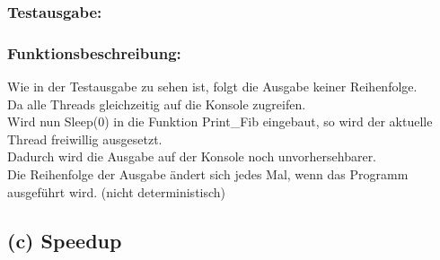\documentclass[a4paper,12pt]{article}
\begin{document}
\subsubsection{Testausgabe:}

\subsubsection{Funktionsbeschreibung:}
Wie in der Testausgabe zu sehen ist, folgt die Ausgabe keiner Reihenfolge.\\
Da alle Threads gleichzeitig auf die Konsole zugreifen.\\
Wird nun Sleep(0) in die Funktion Print\_Fib eingebaut, so wird der aktuelle Thread freiwillig ausgesetzt.\\
Dadurch wird die Ausgabe auf der Konsole noch unvorhersehbarer.\\
Die Reihenfolge der Ausgabe ändert sich jedes Mal, wenn das Programm ausgeführt wird. (nicht deterministisch)\\
\newpage
\subsection{(c) Speedup}
\end{document}
